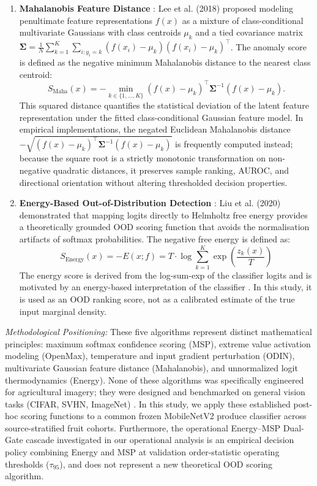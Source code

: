 \begin{enumerate}
\item \textbf{Mahalanobis Feature Distance} \cite{lee2018simple}: Lee et al. (2018) proposed modeling penultimate feature representations $f(x)$ as a mixture of class-conditional multivariate Gaussians with class centroids $\mu_k$ and a tied covariance matrix $\mathbf{\Sigma} = \frac{1}{N} \sum_{k=1}^K \sum_{i: y_i=k} (f(x_i) - \mu_k)(f(x_i) - \mu_k)^\top$. The anomaly score is defined as the negative minimum Mahalanobis distance to the nearest class centroid:
\begin{equation}
S_{\text{Maha}}(x) = -\min_{k \in \{1,\dots,K\}} (f(x) - \mu_k)^\top \mathbf{\Sigma}^{-1} (f(x) - \mu_k).
\label{eq:mahalanobis}
\end{equation}
This squared distance quantifies the statistical deviation of the latent feature representation under the fitted class-conditional Gaussian feature model. In empirical implementations, the negated Euclidean Mahalanobis distance $-\sqrt{(f(x) - \mu_k)^\top \mathbf{\Sigma}^{-1} (f(x) - \mu_k)}$ is frequently computed instead; because the square root is a strictly monotonic transformation on non-negative quadratic distances, it preserves sample ranking, AUROC, and directional orientation without altering thresholded decision properties.

\item \textbf{Energy-Based Out-of-Distribution Detection} \cite{liu2020energy}: Liu et al. (2020) demonstrated that mapping logits directly to Helmholtz free energy provides a theoretically grounded OOD scoring function that avoids the normalisation artifacts of softmax probabilities. The negative free energy is defined as:
\begin{equation}
S_{\text{Energy}}(x) = -E(x; f) = T \cdot \log \sum_{k=1}^K \exp\left(\frac{z_k(x)}{T}\right)
\label{eq:energy}
\end{equation}
The energy score is derived from the log-sum-exp of the classifier logits and is motivated by an energy-based interpretation of the classifier \cite{liu2020energy}. In this study, it is used as an OOD ranking score, not as a calibrated estimate of the true input marginal density.
\end{enumerate}

\noindent \textit{Methodological Positioning:} These five algorithms represent distinct mathematical principles: maximum softmax confidence scoring (MSP), extreme value activation modeling (OpenMax), temperature and input gradient perturbation (ODIN), multivariate Gaussian feature distance (Mahalanobis), and unnormalized logit thermodynamics (Energy). None of these algorithms was specifically engineered for agricultural imagery; they were designed and benchmarked on general vision tasks (CIFAR, SVHN, ImageNet) \cite{yang2024generalized}. In this study, we apply these established post-hoc scoring functions to a common frozen MobileNetV2 produce classifier across source-stratified fruit cohorts. Furthermore, the operational Energy--MSP Dual-Gate cascade investigated in our operational analysis is an empirical decision policy combining Energy and MSP at validation order-statistic operating thresholds ($\tau_{95}$), and does not represent a new theoretical OOD scoring algorithm.

